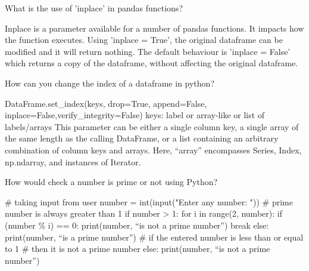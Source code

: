 	\begin{qanda}
		\begin{question}
What is the use of 'inplace' in pandas functions?
		\end{question}
		\begin{answer}
Inplace is a parameter available for a number of pandas functions. It impacts how the function executes. Using 'inplace = True', the original dataframe can be modified and it will return nothing. The default behaviour is 'inplace = False' which returns a copy of the dataframe, without affecting the original dataframe.
		\end{answer}
	\end{qanda}

	\begin{qanda}
		\begin{question}
How can you change the index of a dataframe in python?
		\end{question}
		\begin{answer}
DataFrame.set\_index(keys, drop=True, append=False, inplace=False,\newline{}\hspace*{48pt}verify\_integrity=False)
\newline{}keys: label or array-like or list of labels/arrays This parameter can be either a single column key, a single array of the same length as the calling DataFrame, or a list containing an arbitrary combination of column keys and arrays. Here, ``array'' encompasses Series, Index, np.ndarray, and instances of Iterator.
		\end{answer}
	\end{qanda}

	\begin{qanda}
		\begin{question}
 How would check a number is prime or not using Python?
		\end{question}
		\begin{answer}
\# taking input from user number = int(input("Enter any number: ")) \# prime number is always greater than 1 if number > 1: for i in range(2, number): if (number \% i) == 0: print(number, ``is not a prime number'') break else: print(number, ``is a prime number'') \# if the entered number is less than or equal to 1 \# then it is not a prime number else: print(number, ``is not a prime number'')
		\end{answer}
	\end{qanda}

